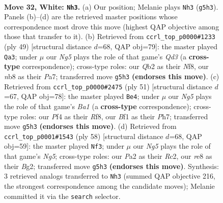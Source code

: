 \documentclass[11pt]{article}
\begin{document}
\clearpage

\begin{figure}[p]\centering
\begin{subfigure}{0.46\textwidth}\centering
\resizebox{\linewidth}{!}{%
\newchessgame
\chessboard[
  setfen={1n2r1k1/3b1p1p/2q3p1/4PpN1/p4P2/8/PQP2KPP/5B1R w - - 0 32},
  showmover=false,
  pgfstyle=straightmove, color=movearrow, markmove={g5-h3}
]}
\caption{}
\end{subfigure}\hfill
\begin{subfigure}{0.46\textwidth}\centering
\resizebox{\linewidth}{!}{%
\newchessgame
\chessboard[
  setfen={5nk1/pb2rpp1/2pq3p/P7/2QP3P/5NP1/5PB1/2R3K1 b - - 0 25},
  showmover=false,
  pgfstyle=straightmove, color=movearrow, markmove={d6-a3}
]}
\caption{}
\end{subfigure}
\\[4pt]
\begin{subfigure}{0.46\textwidth}\centering
\resizebox{\linewidth}{!}{%
\newchessgame
\chessboard[
  setfen={b4r1k/2q2ppp/3ppn2/1p6/3P3P/2PN2Q1/1PB2PP1/4R1K1 b - - 1 26},
  showmover=false,
  pgfstyle=straightmove, color=movearrow, markmove={a8-e4}
]}
\caption{}
\end{subfigure}\hfill
\begin{subfigure}{0.46\textwidth}\centering
\resizebox{\linewidth}{!}{%
\newchessgame
\chessboard[
  setfen={5rbk/1p4bp/6p1/3pp1N1/3q3P/3P2P1/P1R1QPB1/6K1 w - - 0 30},
  showmover=false,
  pgfstyle=straightmove, color=movearrow, markmove={g5-f3}
]}
\caption{}
\end{subfigure}
\caption{\textbf{Move 32, White: \texttt{Nh3}.} (a) Our position; Melanie plays \texttt{Nh3} (\texttt{g5h3}). Panels (b)--(d) are the retrieved master positions whose correspondence most drove this move (highest QAP objective among those that transfer to it). (b) Retrieved from \texttt{ccrl\_top\_p0000\#1233} (ply 49) [structural distance $d$=68, QAP obj=79]: the master played \texttt{Qa3}; under $\mu$ our \emph{Ng5} plays the role of that game's \emph{Qd3} (a \textbf{cross-type} correspondence); cross-type roles: our \emph{Q}b2 as their \emph{N}f8, our \emph{n}b8 as their \emph{P}a7; transferred move \texttt{g5h3} \textbf{(endorses this move)}. (c) Retrieved from \texttt{ccrl\_top\_p0000\#2475} (ply 51) [structural distance $d$=67, QAP obj=78]: the master played \texttt{Be4}; under $\mu$ our \emph{Ng5} plays the role of that game's \emph{Ba1} (a \textbf{cross-type} correspondence); cross-type roles: our \emph{P}f4 as their \emph{R}f8, our \emph{B}f1 as their \emph{P}h7; transferred move \texttt{g5h3} \textbf{(endorses this move)}. (d) Retrieved from \texttt{ccrl\_top\_p0001\#1543} (ply 58) [structural distance $d$=68, QAP obj=59]: the master played \texttt{Nf3}; under $\mu$ our \emph{Ng5} plays the role of that game's \emph{Ng5}; cross-type roles: our \emph{P}a2 as their \emph{R}c2, our \emph{r}e8 as their \emph{B}g2; transferred move \texttt{g5h3} \textbf{(endorses this move)}. Synthesis: 3 retrieved analogs transferred to \texttt{Nh3} (summed QAP objective 216, the strongest correspondence among the candidate moves); Melanie committed it via the \texttt{search} selector.}
\label{fig:thought-m62}
\end{figure}
\end{document}
